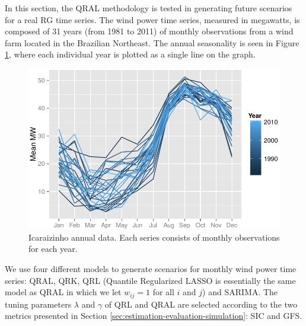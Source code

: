 In this section, the QRAL methodology is tested in generating future scenarios for a real RG time series. The wind power time series, measured in megawatts, is composed of 31 years (from 1981 to 2011) of monthly observations from a wind farm located in the Brazilian Northeast. %
The annual seasonality is seen in Figure \ref{fig:icaraizinho-mensal}, where each individual year is plotted as a single line on the graph. 
\begin{figure}[ht]
\centering
\includegraphics[width=0.8\linewidth]{Images/icaraizinho-mensal2.pdf}
\caption{Icaraizinho annual data. Each series consists of monthly observations for each year.}
\label{fig:icaraizinho-mensal}
\end{figure}

We use four different models to generate scenarios for monthly wind power time series:  QRAL, QRK, QRL (Quantile Regularized LASSO is essentially the same model as QRAL in which we let $w_{ij} = 1$ for all $i$ and $j$) and SARIMA. 
The tuning parameters $\lambda$ and $\gamma$ of QRL and QRAL are selected according to the two metrics presented in Section \ref{sec:estimation-evaluation-simulation}: SIC and GFS.

